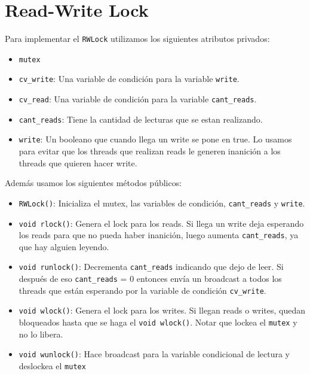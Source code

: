 \documentclass[hidelinks,a4paper,12pt, nofootinbib]{article}
\begin{document}
\maketitle
\tableofcontents
\newpage

\section{Read-Write Lock}
Para implementar el \texttt{RWLock} utilizamos los siguientes atributos privados:
\begin{itemize}
	\item \texttt{mutex}
	\item \texttt{cv\_write}: Una variable de condición para la variable \texttt{write}. 
	\item \texttt{cv\_read}: Una variable de condición para la variable \texttt{cant\_reads}.
	\item \texttt{cant\_reads}: Tiene la cantidad de lecturas que se estan realizando.
	\item \texttt{write}: Un booleano que cuando llega un write se pone en true. Lo usamos para evitar que los threads que realizan reads le generen inanición a los threads que quieren hacer write.
\end{itemize}

Además usamos los siguientes métodos públicos:
\begin{itemize}
	\item \texttt{RWLock()}: Inicializa el mutex, las variables de condición, \texttt{cant\_reads} y \texttt{write}.
	\item \texttt{void rlock()}: Genera el lock para los reads. Si llega un write deja esperando los reads para que no pueda haber inanición, luego aumenta \texttt{cant\_reads}, ya que hay alguien leyendo. 
	\item \texttt{void runlock()}: Decrementa \texttt{cant\_reads} indicando que dejo de leer. Si después de eso \texttt{cant\_reads} = 0 entonces envía un broadcast a todos los threads que están esperando por la variable de condición \texttt{cv\_write}.
	\item \texttt{void wlock()}: Genera el lock para los writes. Si llegan reads o writes, quedan bloqueados hasta que se haga el  \texttt{void wlock()}. Notar que lockea el \texttt{mutex} y no lo libera.
	\item \texttt{void wunlock()}: Hace broadcast para la variable condicional de lectura y deslockea el \texttt{mutex}
\end{itemize}
\end{document}
